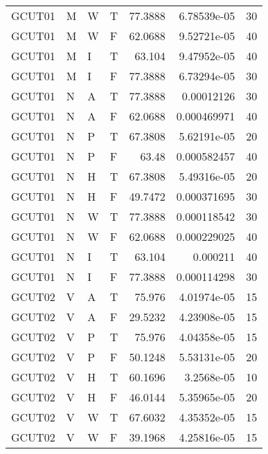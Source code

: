\begin{longtable}{llllrrr}
    GCUT01   & M     & W     & T          & 77.3888    & 6.78539e-05 & 30       \\
    GCUT01   & M     & W     & F          & 62.0688    & 9.52721e-05 & 40       \\
    GCUT01   & M     & I     & T          & 63.104     & 9.47952e-05 & 40       \\
    GCUT01   & M     & I     & F          & 77.3888    & 6.73294e-05 & 30       \\
    GCUT01   & N     & A     & T          & 77.3888    & 0.00012126  & 30       \\
    GCUT01   & N     & A     & F          & 62.0688    & 0.000469971 & 40       \\
    GCUT01   & N     & P     & T          & 67.3808    & 5.62191e-05 & 20       \\
    GCUT01   & N     & P     & F          & 63.48      & 0.000582457 & 40       \\
    GCUT01   & N     & H     & T          & 67.3808    & 5.49316e-05 & 20       \\
    GCUT01   & N     & H     & F          & 49.7472    & 0.000371695 & 30       \\
    GCUT01   & N     & W     & T          & 77.3888    & 0.000118542 & 30       \\
    GCUT01   & N     & W     & F          & 62.0688    & 0.000229025 & 40       \\
    GCUT01   & N     & I     & T          & 63.104     & 0.000211    & 40       \\
    GCUT01   & N     & I     & F          & 77.3888    & 0.000114298 & 30       \\
    GCUT02   & V     & A     & T          & 75.976     & 4.01974e-05 & 15       \\
    GCUT02   & V     & A     & F          & 29.5232    & 4.23908e-05 & 15       \\
    GCUT02   & V     & P     & T          & 75.976     & 4.04358e-05 & 15       \\
    GCUT02   & V     & P     & F          & 50.1248    & 5.53131e-05 & 20       \\
    GCUT02   & V     & H     & T          & 60.1696    & 3.2568e-05  & 10       \\
    GCUT02   & V     & H     & F          & 46.0144    & 5.35965e-05 & 20       \\
    GCUT02   & V     & W     & T          & 67.6032    & 4.35352e-05 & 15       \\
    GCUT02   & V     & W     & F          & 39.1968    & 4.25816e-05 & 15       \\

\end{longtable}
